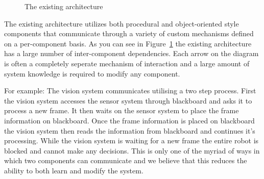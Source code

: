 \documentclass[english,12pt]{scrartcl}
\begin{document}
\begin{figure}
                \caption {The existing architecture}
                \label {fig:HighLevelExistingArchitecture}
            \end{figure}
            
            The existing architecture utilizes both procedural and object-oriented style components that
            communicate through a variety of custom mechanisms defined on a per-component basis.
            As you can see in Figure~\ref{fig:HighLevelExistingArchitecture} the existing architecture has
            a large number of inter-component dependencies. 
            Each arrow on the diagram is often a completely seperate mechanism of interaction and a large 
            amount of system knowledge is required to modify any component.

            For example: The vision system communicates utilising a two step process. 
            First the vision system accesses the sensor system through blackboard and asks it to process a new frame.
            It then waits on the sensor system to place the frame information on blackboard. 
            Once the frame information is placed on blackboard the vision system then reads the information 
            from blackboard and continues it's processing. 
            While the vision system is waiting for a new frame the entire robot is blocked and cannot make any decisions.
            This is only one of the myriad of ways in which two components can communicate and we believe that 
            this reduces the ability to both learn and modify the system.
\end{document}
